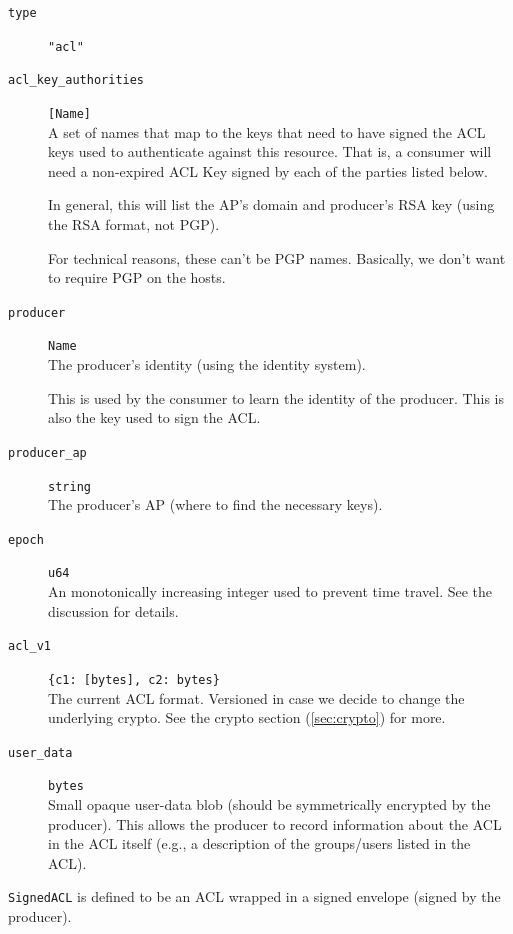 \documentclass[pdftex,12pt,a4papaer,twoside,notitlepage]{report}
\begin{document}
\begin{leftbar}
\begin{description}
\item[\texttt{type}] \verb|"acl"|
\item[\texttt{acl\_key\_authorities}] \verb=[Name]= \\
  A set of names that map to the keys that need to have signed the ACL keys used
  to authenticate against this resource. That is, a consumer will need a
  non-expired ACL Key signed by each of the parties listed below.
  
  In general, this will list the AP's domain and producer's RSA key (using the
  RSA format, not PGP).
  
  For technical reasons, these can't be PGP names. Basically, we don't want to
  require PGP on the hosts.

\item[\texttt{producer}] \texttt{Name} \\
  The producer's identity (using the identity system).
  
  This is used by the consumer to learn the identity of the producer. This is
  also the key used to sign the ACL.

\item[\texttt{producer\_ap}] \texttt{string} \\
  The producer's AP (where to find the necessary keys).

\item[\texttt{epoch}] \texttt{u64} \\
  An monotonically increasing integer used to prevent
  time travel. See the discussion for details.

\item[\texttt{acl\_v1}] \verb={c1: [bytes], c2: bytes}= \\
  The current ACL format. Versioned in case we decide to change the underlying
  crypto. See the crypto section (\ref{sec:crypto}) for more.

\item[\texttt{user\_data}] \texttt{bytes} \\
  Small opaque user-data blob (should be symmetrically encrypted by the
  producer). This allows the producer to record information about the ACL in the
  ACL itself (e.g., a description of the groups/users listed in the ACL).
\end{description}
\end{leftbar}

\texttt{SignedACL} is defined to be an ACL wrapped in a signed envelope (signed
by the producer).
\end{document}
